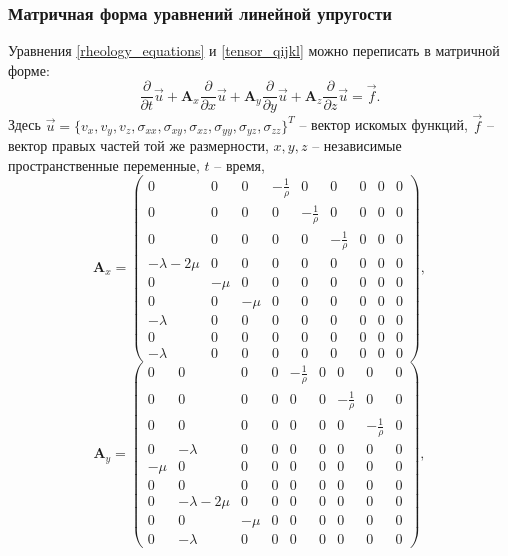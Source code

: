 \subsubsection{Матричная форма уравнений линейной упругости}
Уравнения \ref{rheology_equations} и \ref{tensor_qijkl} можно переписать в матричной
форме:
\begin{equation}
\label{matrix_equation}
\frac{\partial}{\partial{t}}\vec{u}+\mathbf{A}_x\frac{\partial}{\partial{x}}\vec{u}+
\mathbf{A}_y\frac{\partial}{\partial{y}}\vec{u}+
\mathbf{A}_z\frac{\partial}{\partial{z}}\vec{u}=\vec{f}.
\end{equation}
Здесь
$\vec{u}=\{v_x,v_y,v_z,\sigma_{xx},\sigma_{xy},\sigma_{xz},\sigma_{yy},\sigma_{yz},\sigma_{zz}\}^T$
-- вектор искомых функций, $\vec{f}$ -- вектор правых частей той же размерности,
$x,y,z$ --  независимые пространственные переменные, $t$ -- время,
\begin{displaymath}
\mathbf{A}_x =
\left( \begin{array}{cccccccccccc}
0 & 0 & 0 & -\frac 1 \rho & 0 & 0 & 0 & 0 & 0 \\ 
0 & 0 & 0 & 0 & -\frac 1 \rho & 0 & 0 & 0 & 0 \\ 
0 & 0 & 0 & 0 & 0 & -\frac 1 \rho & 0 & 0 & 0 \\ 
-\lambda-2\mu & 0 & 0 & 0 & 0 & 0 & 0 & 0 & 0 \\ 
0 & -\mu & 0 & 0 & 0 & 0 & 0 & 0 & 0 \\ 
0 & 0 & -\mu & 0 & 0 & 0 & 0 & 0 & 0 \\ 
-\lambda & 0 & 0 & 0 & 0 & 0 & 0 & 0 & 0 \\ 
0 & 0 & 0 & 0 & 0 & 0 & 0 & 0 & 0 \\ 
-\lambda & 0 & 0 & 0 & 0 & 0 & 0 & 0 & 0  
\end{array} \right),
\end{displaymath} 
\begin{displaymath}
\mathbf{A}_y =
\left( \begin{array}{cccccccccccc}
0 & 0 & 0 & 0 & -\frac 1 \rho & 0 & 0 & 0 & 0 \\ 
0 & 0 & 0 & 0 & 0 & 0 & -\frac 1 \rho & 0 & 0 \\ 
0 & 0 & 0 & 0 & 0 & 0 & 0 & -\frac 1 \rho & 0 \\ 
0 & -\lambda & 0 & 0 & 0 & 0 & 0 & 0 & 0 \\ 
-\mu & 0 & 0 & 0 & 0 & 0 & 0 & 0 & 0 \\ 
0 & 0 & 0 & 0 & 0 & 0 & 0 & 0 & 0 \\ 
0 & -\lambda-2\mu & 0 & 0 & 0 & 0 & 0 & 0 & 0 \\ 
0 & 0 & -\mu & 0 & 0 & 0 & 0 & 0 & 0 \\ 
0 & -\lambda & 0 & 0 & 0 & 0 & 0 & 0 & 0  
\end{array} \right),
\end{displaymath}
